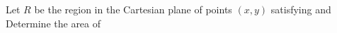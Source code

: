 Let $R$ be the region in the Cartesian plane of points $(x,y)$ satisfying   and   Determine the area of 